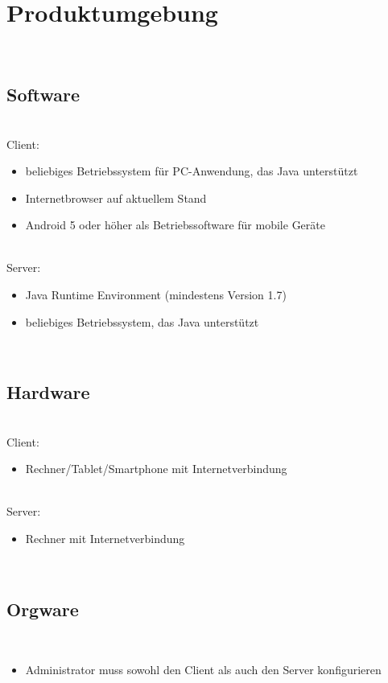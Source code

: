 \section{Produktumgebung}\\
\subsection{Software}\\
Client: \\
\begin{itemize}
\item beliebiges Betriebssystem für PC-Anwendung, das Java unterstützt \\
\item Internetbrowser auf aktuellem Stand \\
\item Android 5 oder höher als Betriebssoftware für mobile Geräte\\
\end{itemize} \\
Server: \\
\begin{itemize}
\item Java Runtime Environment (mindestens Version 1.7) \\
\item beliebiges Betriebssystem, das Java unterstützt \\
\end{itemize}\\

\subsection{Hardware}\\
Client: \\
\begin{itemize}
\item Rechner/Tablet/Smartphone mit Internetverbindung \\
\end{itemize} \\
Server: \\
\begin{itemize}
\item Rechner mit Internetverbindung \\
\end{itemize}\\

\subsection{Orgware}\\
\begin{itemize}
\item Administrator muss sowohl den Client als auch den Server konfigurieren\\
\end{itemize}\\
